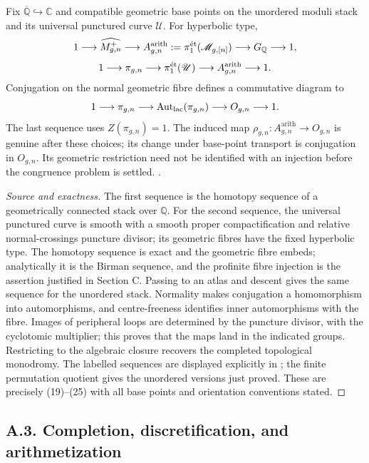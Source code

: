 Fix $\overline{\mathbb Q}\hookrightarrow\mathbb C$ and compatible geometric base points on the unordered moduli stack and its universal punctured curve $\mathscr U$. For hyperbolic type,
\[
1\longrightarrow\widehat{M^+_{g,n}}\longrightarrow
 A^{\mathrm{arith}}_{g,n}:=\pi_1^{\mathrm{\acute et}}(\mathscr M_{g,[n]})
 \longrightarrow G_{\mathbb Q}\longrightarrow1,
\]
\[
1\longrightarrow\pi_{g,n}\longrightarrow\pi_1^{\mathrm{\acute et}}(\mathscr U)
 \longrightarrow A^{\mathrm{arith}}_{g,n}\longrightarrow1.
\]
Conjugation on the normal geometric fibre defines a commutative diagram to
\[
1\longrightarrow\pi_{g,n}\longrightarrow
 \operatorname{Aut}_{\mathrm{lac}}(\pi_{g,n})\longrightarrow O_{g,n}\longrightarrow1.
\]
The last sequence uses $Z(\pi_{g,n})=1$. The induced map
$\rho_{g,n}:A^{\mathrm{arith}}_{g,n}\to O_{g,n}$ is genuine after these choices; its change under base-point transport is conjugation in $O_{g,n}$. Its geometric restriction need not be identified with an injection before the congruence problem is settled.
.
\begin{proof}[Source and exactness]
The first sequence is the homotopy sequence of a geometrically connected stack over $\mathbb Q$. For the second sequence, the universal punctured curve is smooth with a smooth proper compactification and relative normal-crossings puncture divisor; its geometric fibres have the fixed hyperbolic type. The homotopy sequence is exact and the geometric fibre embeds; analytically it is the Birman sequence, and the profinite fibre injection is the assertion justified in Section C. Passing to an \etale atlas and descent gives the same sequence for the unordered stack. Normality makes conjugation a homomorphism into automorphisms, and centre-freeness identifies inner automorphisms with the fibre. Images of peripheral loops are determined by the puncture divisor, with the cyclotomic multiplier; this proves that the maps land in the indicated groups. Restricting to the algebraic closure recovers the completed topological monodromy. The labelled sequences are displayed explicitly in \citet[Corollary 6.4]{HoshiMochizuki2011}; the finite permutation quotient gives the unordered versions just proved. These are precisely (19)--(25) with all base points and orientation conventions stated.
\end{proof}

\subsection{A.3. Completion, discretification, and arithmetization}

